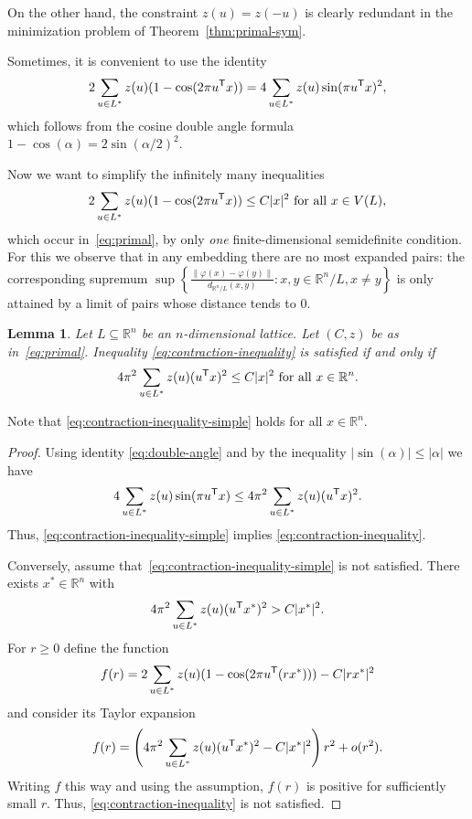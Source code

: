 \documentclass{amsart}
\newtheorem{lemma}[defin]{Lemma}
\newcommand{\R}{\mathbb{R}}
\begin{document}
On the other hand, the constraint $z(u) = z(-u)$ is clearly redundant
in the minimization problem of Theorem~\ref{thm:primal-sym}.

Sometimes, it is convenient to use the identity
\begin{equation}
\label{eq:double-angle}
2 \sum_{u \in L^*} z(u) (1 - \cos(2\pi u^{\sf T} x)) = 4 \sum_{u \in L^*} z(u) \sin(\pi u^{\sf T} x)^2,
\end{equation}
which follows from the cosine double angle formula $1 - \cos(\alpha) = 2\sin(\alpha/2)^2$.

\medskip

Now we want to simplify the infinitely many inequalities
  \begin{equation}
 \label{eq:contraction-inequality}
2  \sum_{u\in L^*} z(u) (1-\cos(2\pi u^{\sf T} x)) \leq C |x|^2 \text{ for all } x \in V(L),
\end{equation}
which occur in~\eqref{eq:primal}, by only \textit{one}
finite-dimensional semidefinite condition. For this we observe that in any embedding there are no most expanded pairs: the
corresponding supremum
$\sup\left\{\frac{\|\varphi(x) -
  \varphi(y)\|}{d_{\R^n/L}(x,y)} : x,y \in \R^n / L,  x \neq y \right\}$ is only attained by a limit of pairs
  whose distance tends to $0$.

\begin{lemma}
  Let $L \subseteq \R^n$ be an $n$-dimensional lattice. Let $(C,z)$ be
  as in~\eqref{eq:primal}. Inequality
  \eqref{eq:contraction-inequality} is satisfied if and only if
\begin{equation}
   \label{eq:contraction-inequality-simple}
    4 \pi^2 \sum_{u\in L^*} z(u) (u^{\sf T} x)^2 \le  C |x|^2 \text{ for all }  x \in \R^n.
\end{equation}
\end{lemma}

Note that \eqref{eq:contraction-inequality-simple} holds for all $x \in \R^n$.

\begin{proof}
Using identity \eqref{eq:double-angle} and by the inequality $ |\sin(\alpha)| \leq
|\alpha|$ we have
  \[
     4 \sum_{u\in L^*} z(u) \sin(\pi u^{\sf T} x) \leq 4\pi^2
      \sum_{u \in L^*} z(u) (u^{\sf T} x)^2.
 \]
Thus, \eqref{eq:contraction-inequality-simple} implies
 \eqref{eq:contraction-inequality}.

Conversely, assume that~\eqref{eq:contraction-inequality-simple}
is not satisfied. There exists $x^* \in \R^n$ with
\begin{equation*}
  4 \pi^2 \sum\limits_{u\in L^*} z(u) (u^{\sf T} x^*)^2 >  C|x^*|^2.
\end{equation*}
For $r \geq 0$ define the function
\[
  f(r) =   2 \sum_{u\in L^*} z(u) (1-\cos(2\pi u^{\sf T} (rx^*))) - C|rx^*|^2
\]
and consider its Taylor expansion
\[
  f(r) = \left( 4\pi^2 \sum\limits_{u\in L^*} z(u) (u^{\sf T}
    x^*)^2  - C|x^*|^2\right) r^2 + o(r^2).
\]
Writing $ f $ this way and using the assumption, $f(r)$ is positive for
sufficiently small $r$. Thus, \eqref{eq:contraction-inequality} is not
satisfied.
\end{proof}
\end{document}
